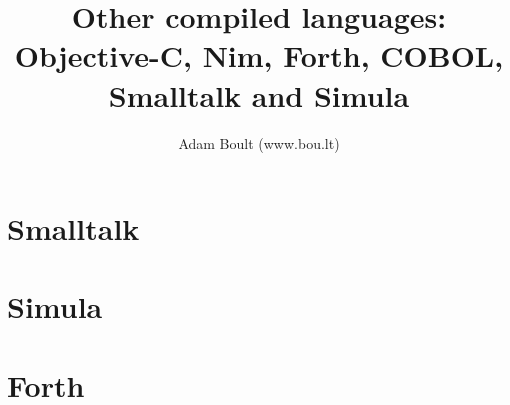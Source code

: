 \documentclass[oneside]{book}
\begin{document}
\author{Adam Boult (www.bou.lt)}
\title{Other compiled languages: Objective-C, Nim, Forth, COBOL, Smalltalk and Simula}
\maketitle

\setcounter{tocdepth}{0}
\tableofcontents



\part{Smalltalk}

\part{Simula}

\part{Forth}

\end{document}
